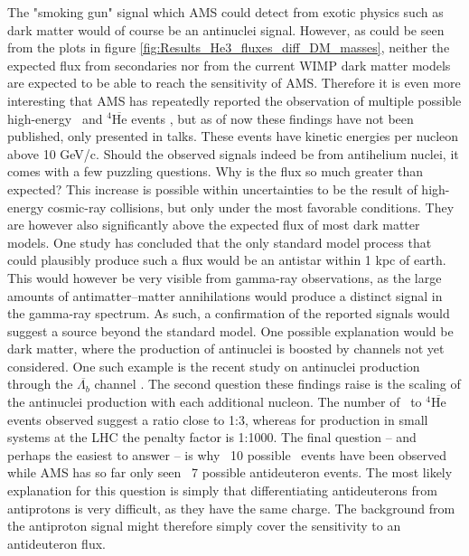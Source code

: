 The "smoking gun" signal which AMS could detect from exotic physics such as dark matter would of course be an antinuclei signal. However, as could be seen from the plots in figure \ref{fig:Results_He3_fluxes_diff_DM_masses}, neither the expected flux from secondaries nor from the current WIMP dark matter models are expected to be able to reach the sensitivity of AMS. Therefore it is even more interesting that AMS has repeatedly reported the observation of multiple possible high-energy \ahe\ and $^4\mathrm{\overline{He}}$ events \cite{}, but as of now these findings have not been published, only presented in talks. These events have kinetic energies per nucleon above 10 GeV/c. Should the observed signals indeed be from antihelium nuclei, it comes with a few puzzling questions. Why is the flux so much greater than expected? This increase is possible within uncertainties to be the result of high-energy cosmic-ray collisions, but only under the most favorable conditions. They are however also significantly above the expected flux of most dark matter models. One study has concluded that the only standard model process that could plausibly produce such a flux would be an antistar within 1 kpc of earth\cite{}. This would however be very visible from gamma-ray observations, as the large amounts of antimatter--matter annihilations would produce a distinct signal in the gamma-ray spectrum\cite{}. As such, a confirmation of the reported signals would suggest a source beyond the standard model. One possible explanation would be dark matter, where the production of antinuclei is boosted by channels not yet considered. One such example is the recent study on antinuclei production through the $\overline{\Lambda_b}$ channel \cite{}. The second question these findings raise is the scaling of the antinuclei production with each additional nucleon. The number of \ahe\ to $^4\mathrm{\overline{He}}$ events observed suggest a ratio close to 1:3, whereas for production in small systems at the LHC the penalty factor is 1:1000\cite{}. The final question -- and perhaps the easiest to answer -- is why ~10 possible \ahe\ events have been observed while AMS has so far only seen ~7 possible antideuteron events\cite{MIAPP_AMS_talk}. The most likely explanation for this question is simply that differentiating antideuterons from antiprotons is very difficult, as they have the same charge. The background from the antiproton signal might therefore simply cover the sensitivity to an antideuteron flux.\\

